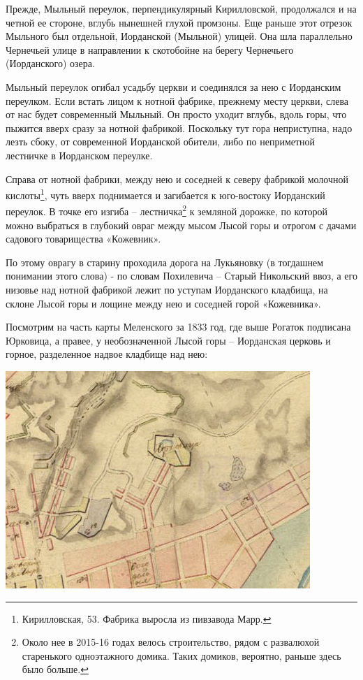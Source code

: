Прежде, Мыльный переулок, перпенди\-кулярный Ки\-рилловской, продолжался и на четной ее стороне, вглубь нынешней глухой промзоны. Еще раньше этот отрезок Мыльного был отдельной, Иорданской (Мыльной) улицей. Она шла параллельно Чернечьей улице в направлении к скотобойне на берегу Чернечьего (Иорданского) озера.

Мыльный переулок огибал усадьбу церкви и  соединялся за нею с Иорданским переулком. Если встать лицом к нотной фабрике, прежнему месту церкви, слева от нас будет современный Мыльный. Он просто уходит вглубь, вдоль горы, что пыжится вверх сразу за нотной фабрикой. Поскольку тут гора неприступна, надо лезть сбоку, от современной Иорданской обители, либо по неприметной лестничке в Иорданском переулке.

Справа от нотной фабрики, между нею и соседней к северу фабрикой молочной кислоты\footnote{Кирилловская, 53. Фабрика выросла из пивзавода Марр.}, чуть вверх поднимается и загибается к юго-востоку Иорданский переулок. В точке его изгиба – лестничка\footnote{Около нее в 2015-16 годах велось строительство, рядом с развалюхой старенького одноэтажного домика. Таких домиков, вероятно, раньше здесь было больше.} к земляной дорожке, по которой можно выбраться в глубокий овраг между мысом Лысой горы и отрогом с дачами садового товарищества «Кожевник». 

По этому оврагу в старину проходила дорога на Лукьяновку (в тогдашнем понимании этого слова) - по словам Похилевича – Старый Никольский ввоз, а его низовье над нотной фабрикой лежит по уступам Иорданского кладбища, на склоне Лысой горы и лощине между нею и соседней горой «Кожевника».

Посмотрим на часть карты Меленского за 1833 год, где выше Рогаток подписана Юрковица, а правее, у необозначенной Лысой горы – Иорданская церковь и горное, разделенное надвое кладбище над нею:

\begin{center}
\includegraphics[width=\linewidth]{chast-kirvys/lys02/1833-melenskiy.jpg}
\end{center}

